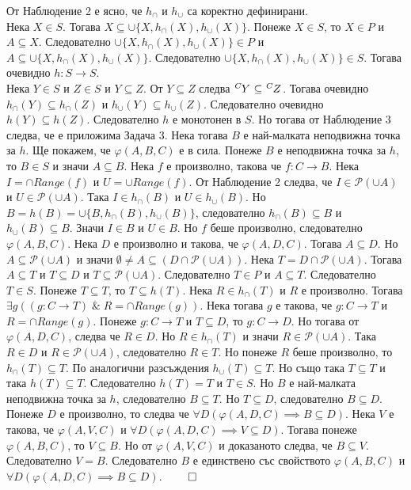 \documentclass[12pt]{article}
\begin{document}
От Наблюдение 2 е ясно, че \(h_\cap\) и \(h_\cup\) са коректно дефинирани. \\
Нека \(X \in S\). Тогава \(X \subseteq \cup \{X,  h_\cap(X), h_\cup(X)\}\).
Понеже \(X \in S\), то \(X \in P\) и \(A \subseteq X\).
Следователно \(\cup \{X,  h_\cap(X), h_\cup(X)\} \in P\) и \(A \subseteq \cup \{X,  h_\cap(X), h_\cup(X)\}\). Следователно \(\cup \{X,  h_\cap(X), h_\cup(X)\} \in S\).
Тогава очевидно \(h : S \to S\). \\
Нека \(Y \in S\) и \(Z \in S\) и \(Y \subseteq Z\).
От \(Y \subseteq Z\) следва \(\tensor[^C]{Y}{} \subseteq \tensor[^C]{Z}{}\).
Тогава очевидно \(h_\cap(Y) \subseteq h_\cap(Z)\) и \(h_\cup(Y) \subseteq h_\cup(Z)\).
Следователно очевидно \(h(Y) \subseteq h(Z)\). Следователно \(h\) е монотонен в \(S\).
Но тогава от Наблюдение 3 следва, че е приложима Задача 3.
Нека тогава \(B\) е най-малката неподвижна точка за \(h\).
Ще покажем, че \(\varphi(A, B, C)\) е в сила.
Понеже \(B\) е неподвижна точка за \(h\), то \(B \in S\) и значи \(A \subseteq B\).
Нека \(f\) е произволно, такова че \(f : C \to B\).
Нека \(I = \cap Range(f)\) и \(U = \cup Range(f)\).
От Наблюдение 2 следва, че \(I \in \mathcal{P}(\cup A)\) и \(U \in \mathcal{P}(\cup A)\).
Така \(I \in h_\cap(B)\) и \(U \in h_\cup(B)\).
Но \(B = h(B) = \cup\{B, h_\cap(B), h_\cup(B)\}\),
следователно \(h_\cap(B) \subseteq B\) и \(h_\cup(B) \subseteq B\).
Значи \(I \in B\) и \(U \in B\).
Но \(f\) беше произволно, следователно \(\varphi(A, B, C)\).
Нека \(D\) е произволно и такова, че \(\varphi(A, D, C)\).
Тогава \(A \subseteq D\). Но \(A \subseteq \mathcal{P}(\cup A)\)
и значи \(\emptyset \neq A \subseteq (D \cap \mathcal{P}(\cup A))\).
Нека \(T = D \cap \mathcal{P}(\cup A)\). Тогава \(A \subseteq T\)
и \(T \subseteq D\) и \(T \subseteq \mathcal{P}(\cup A)\).
Следователно \(T \in P\) и \(A \subseteq T\).
Следователно \(T \in S\). Понеже \(T \subseteq T\), то \(T \subseteq h(T)\).
Нека \(R \in h_\cap(T)\) и \(R\) е произволно.
Тогава \(\exists g ((g : C \to T) \; \& \; R = \cap Range(g))\).
Нека тогава \(g\) е такова, че \(g : C \to T\) и \(R = \cap Range(g)\).
Понеже \(g : C \to T\) и \(T \subseteq D\), то \(g : C \to D\).
Но тогава от \(\varphi(A, D, C)\), следва че \(R \in D\).
Но \(R \in h_\cap(T)\) и значи \(R \in \mathcal{P}(\cup A)\).
Така \(R \in D\) и \(R \in \mathcal{P}(\cup A)\), 
следователно \(R \in T\). Но понеже \(R\) беше произволно,
то \(h_\cap(T) \subseteq T\).
По аналогични разсъждения \(h_\cup(T) \subseteq T\).
Но също така \(T \subseteq T\) и така \(h(T) \subseteq T\).
Следователно \(h(T) = T\) и \(T \in S\).
Но \(B\) е най-малката неподвижна точка за \(h\),
следователно \(B \subseteq T\).
Но \(T \subseteq D\), следователно \(B \subseteq D\).
Понеже \(D\) е произволно, то следва че
\(\forall D (\varphi(A, D, C) \implies B \subseteq D)\).
Нека \(V\) е такова, че \(\varphi(A, V, C)\) и
\(\forall D (\varphi(A, D, C) \implies V \subseteq D)\).
Тогава понеже \(\varphi(A, B, C)\), то \(V \subseteq B\).
Но от \(\varphi(A, V, C)\) и доказаното следва, че \(B \subseteq V\).
Следователно \(V = B\). Следователно \(B\) е единствено със свойството
\(\varphi(A, B, C)\) и \(\forall D (\varphi(A, D, C) \implies B \subseteq D)\). \(\qed\)
\end{document}
